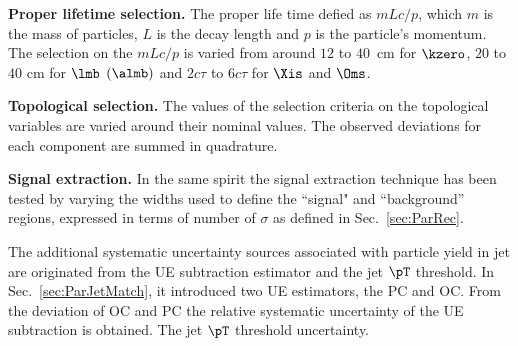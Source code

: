 \textbf{Proper lifetime selection.} The proper life time defied as $mLc/p$, which $m$ is the mass of particles, $L$ is the decay length and $p$ is the particle's momentum.
The selection on the $mLc/p$ is varied from around $12$ to $40$~cm for $\kzero$, $20$ to $40$ cm for $\lmb$ $(\almb)$ and $2c\tau$ to $6c\tau$ for $\Xis$ and $\Oms$.

\textbf{Topological selection.} The values of the selection criteria on the topological variables are varied around their nominal values.
The observed deviations for each component are summed in quadrature.

\textbf{Signal extraction.} In the same spirit the signal extraction technique has been tested by varying the widths used to define the ``signal" and ``background'' regions, expressed in terms of number of $\sigma$ as defined in Sec.~\ref{sec:ParRec}.

The additional systematic uncertainty sources associated with particle yield in jet are originated from the UE subtraction estimator and the jet $\pT$ threshold.
In Sec.~\ref{sec:ParJetMatch}, it introduced two UE estimators, the PC and OC.
From the deviation of OC and PC the relative systematic uncertainty of the UE subtraction is obtained.
The jet $\pT$ threshold uncertainty.